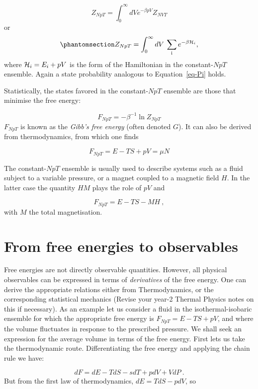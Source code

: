 \documentclass[
  letterpaper,
  DIV=11,
  numbers=noendperiod]{scrreprt}
\begin{document}
\[
Z_{NpT}=\int_0^\infty dV  e^{-\beta p V}Z_{NVT}
\] or \begin{equation}\phantomsection\label{eq-ZNpT}{
Z_{NpT}=\int_0^\infty dV\:\sum_\textrm{i}e^{-\beta {\cal H}_i},
}\end{equation} where \({\cal H}_i=E_i+pV\) is the form of the
Hamiltonian in the constant-\(NpT\) ensemble. Again a state probability
analogous to Equation~\ref{eq-Pi} holds.

Statistically, the states favored in the constant-\(NpT\) ensemble are
those that minimise the free energy:

\[
F_{NpT}=-\beta^{-1}\ln Z_{NpT}
\] \(F_{NpT}\) is known as the \emph{Gibb's free energy} (often denoted
\(G\)). It can also be derived from thermodynamics, from which one finds

\[
F_{NpT}=E-TS+pV=\mu N
\]

The constant-\(NpT\) ensemble is usually used to describe systems such
as a fluid subject to a variable pressure, or a magnet coupled to a
magnetic field \(H\). In the latter case the quantity \(HM\) plays the
role of \(pV\) and

\[
F_{NpT}=E-TS-MH\:,
\] with \(M\) the total magnetisation.

\section*{From free energies to
observables}\label{from-free-energies-to-observables}


Free energies are not directly observable quantities. However, all
physical observables can be expressed in terms of \emph{derivatives} of
the free energy. One can derive the appropriate relations either from
Thermodynamics, or the corresponding statistical mechanics (Revise your
year-2 Thermal Physics notes on this if necessary). As an example let us
consider a fluid in the isothermal-isobaric ensemble for which the
appropriate free energy is \(F_{NpT}=E-TS+pV\), and where the volume
fluctuates in response to the prescribed pressure. We shall seek an
expression for the average volume in terms of the free energy. First
lets us take the thermodynamic route. Differentiating the free energy
and applying the chain rule we have:

\[
dF=dE-TdS-sdT+pdV+VdP\:.
\] But from the first law of thermodynamics, \(dE=TdS-pdV\), so
\end{document}
